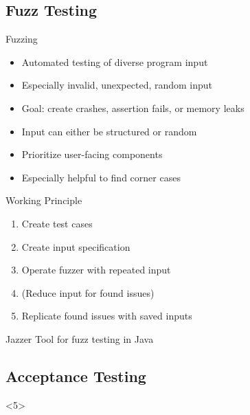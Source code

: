 \subsection{Fuzz Testing}
\begin{frame}{\insertsubsection}
	\begin{fancycolumns}[animation=none]
		\begin{definition}{Fuzzing}
			\begin{itemize}
				\item Automated testing of diverse program input
				\item Especially invalid, unexpected, random input
				\item Goal: create crashes, assertion fails, or memory leaks
				\item Input can either be structured or random
				\item Prioritize user-facing components
				\item Especially helpful to find corner cases
			\end{itemize}
		\end{definition}\pause
		\begin{note}{Working Principle}
			\begin{enumerate}
				\item Create test cases
				\item Create input specification
				\item Operate fuzzer with repeated input
				\item (Reduce input for found issues)
				\item Replicate found issues with saved inputs
			\end{enumerate}
		\end{note} \pause
		\nextcolumn
		 \pause
		\begin{note}{Jazzer} %
			Tool for fuzz testing in Java
		\end{note}
	\end{fancycolumns}
\end{frame}

\subsection{Acceptance Testing}
\begin{frame}<5>{\insertsubsection}
	\slideStagesTesting
\end{frame}

